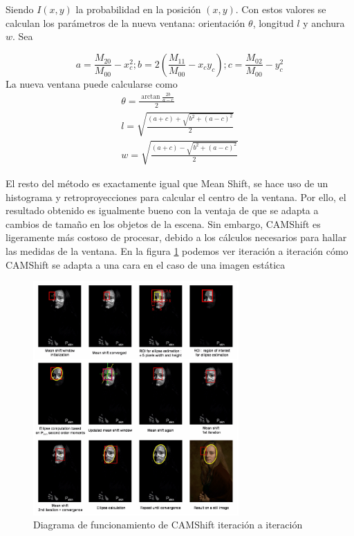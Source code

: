 Siendo $I(x,y)$ la probabilidad en la posición $(x,y)$. Con estos valores se calculan los parámetros de la nueva ventana: orientación $\theta$, longitud $l$ y anchura $w$. Sea

\[
a = \frac{M_{20}}{M_{00}} - x_c^2 ; b = 2(\frac{M_{11}}{M_00}-x_cy_c) ; c = \frac{M_{02}}{M_{00}} - y_c^2
\]
La nueva ventana puede calcularse como
\begin{gather*}
  \theta = \frac{\arctan \frac{2b}{a-c}}{2} \\
  l = \sqrt{\frac{(a+c)+\sqrt{b^2+(a-c)^2}}{2}} \\
  w = \sqrt{\frac{(a+c)-\sqrt{b^2+(a-c)^2}}{2}}
\end{gather*}

El resto del método es exactamente igual que Mean Shift, se hace uso de un histograma y retroproyecciones para calcular el centro de la ventana. Por ello, el resultado obtenido es igualmente bueno con la ventaja de que se adapta a cambios de tamaño en los objetos de la escena. Sin embargo, CAMShift es ligeramente más costoso de procesar, debido a los cálculos necesarios para hallar las medidas de la ventana. En la figura \ref{fig:camshiftopencv} podemos ver iteración a iteración cómo CAMShift se adapta a una cara en el caso de una imagen estática

\begin{figure}
    \centering
    \includegraphics[width=0.7\textwidth]{images/camshift}
    \caption{Diagrama de funcionamiento de CAMShift iteración a iteración}
    \label{fig:camshiftopencv}
\end{figure}

